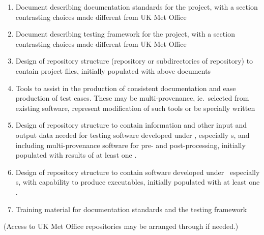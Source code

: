 \begin{enumerate}
\item Document describing documentation standards for the project,
with a section contrasting choices made different from UK Met Office
\item Document describing testing framework for the project,
with a section contrasting choices made different from UK Met Office
\item Design of repository structure (repository or subdirectories of repository)
to contain project files, initially populated with above documents
\item Tools to assist in the production of consistent documentation
and ease production of test cases. These may be multi-provenance, ie.\
selected from existing
software, represent modification of such tools or be specially written
\item  Design of repository structure to contain information
and other input and output data needed for testing software developed under \nep ,
especially \papp s, and including multi-provenance software for
pre- and post-processing, initially populated with results of at least one \papp .
\item Design of repository structure to contain
software developed under \nep\ especially \papp s, with capability to
produce executables, initially populated with at least one \papp .
\item Training material for documentation standards and the testing framework
\end{enumerate}

(Access to UK Met Office repositories may be arranged through \exc if needed.)
